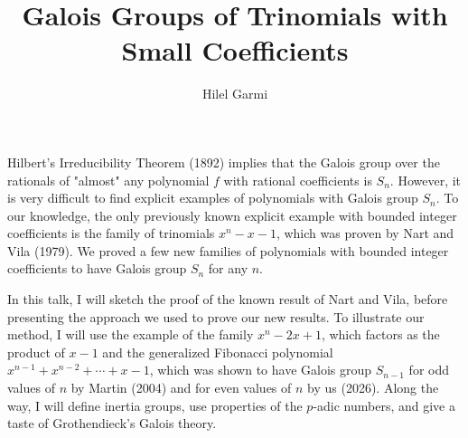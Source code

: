 \documentclass[../../main.tex]{subfiles}
\begin{document}
\title{
  Galois Groups of Trinomials with Small Coefficients
}
\author{Hilel Garmi}
\maketitle
Hilbert's Irreducibility Theorem (1892) implies that the Galois group over the rationals of "almost" any polynomial $f$ with rational coefficients is $S_n$.
However, it is very difficult to find explicit examples of polynomials with Galois group $S_n$.
To our knowledge, the only previously known explicit example with bounded integer coefficients is the family of trinomials $x^n - x - 1$, which was proven by Nart and Vila (1979).
We proved a few new families of polynomials with bounded integer coefficients to have Galois group $S_n$ for any $n$.

In this talk, I will sketch the proof of the known result of Nart and Vila, before presenting the approach we used to prove our new results.
To illustrate our method, I will use the example of the family $x^n - 2x + 1$, which factors as the product of $x-1$ and the generalized Fibonacci polynomial $x^{n-1} + x^{n-2} + \cdots + x - 1$, which was shown to have Galois group $S_{n-1}$ for odd values of $n$ by Martin (2004) and for even values of $n$ by us (2026).
Along the way, I will define inertia groups, use properties of the $p$-adic numbers, and give a taste of Grothendieck's Galois theory.
\end{document}
